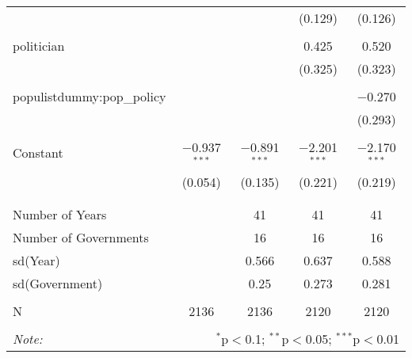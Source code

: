 \begin{table}[!htbp]
\begin{tabular}{@{\extracolsep{5pt}}lcccc}
  &  &  & (0.129) & (0.126) \\ 
  & & & & \\ 
 politician &  &  & 0.425 & 0.520 \\ 
  &  &  & (0.325) & (0.323) \\ 
  & & & & \\ 
 populistdummy:pop\_policy &  &  &  & $-$0.270 \\ 
  &  &  &  & (0.293) \\ 
  & & & & \\ 
 Constant & $-$0.937$^{***}$ & $-$0.891$^{***}$ & $-$2.201$^{***}$ & $-$2.170$^{***}$ \\ 
  & (0.054) & (0.135) & (0.221) & (0.219) \\ 
  & & & & \\ 
\hline \\[-1.8ex] 
Number of Years &  & 41 & 41 & 41 \\ 
Number of Governments &  & 16 & 16 & 16 \\ 
sd(Year) &  & 0.566 & 0.637 & 0.588 \\ 
sd(Government) &  & 0.25 & 0.273 & 0.281 \\ 
 &  &  &  &  \\ 
N & 2136 & 2136 & 2120 & 2120 \\ 
\hline 
\hline \\[-1.8ex] 
\textit{Note:}  & \multicolumn{4}{r}{$^{*}$p$<$0.1; $^{**}$p$<$0.05; $^{***}$p$<$0.01} \\ 
\end{tabular} 
\end{table} 
